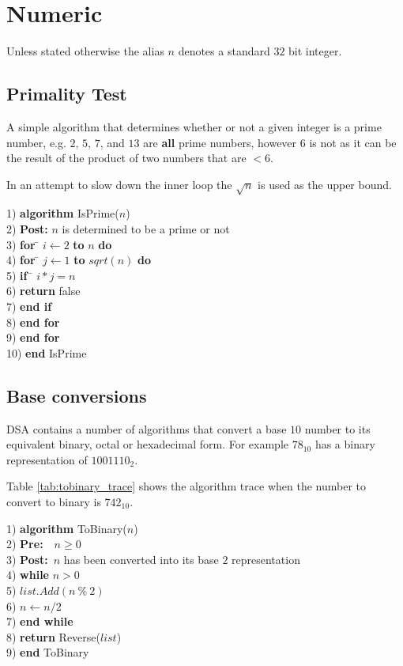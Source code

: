 \chapter{Numeric}
Unless stated otherwise the alias $n$ denotes a standard $32$ bit integer.

\section{Primality Test} \label{cha:Primality}
A simple algorithm that determines whether or not a given integer is a prime number, e.g. $2$, $5$, $7$, and $13$ are \textbf{all} prime numbers, however $6$ is not as it can be the result of the product of two numbers that are $< 6$.

In an attempt to slow down the inner loop the $\sqrt{n}$ is used as the upper bound.

\begin{tabbing}
1) \textbf{alg}\= \textbf{orithm} IsPrime($n$)\\
2) \> \textbf{Post:} $n$ is determined to be a prime or not \\
3) \> \textbf{for} \= $i \leftarrow 2$ \textbf{to} $n$ \textbf{do}\\
4) \> \> \textbf{for} \= $j \leftarrow 1$ \textbf{to} $sqrt(n)$ \textbf{do}\\
5) \> \> \> \textbf{if}~\= $i * j = n$\\
6) \> \> \> \> \textbf{return} false\\
7) \> \> \> \textbf{end if}\\
8) \> \> \textbf{end for}\\	
9) \> \textbf{end for}\\
10) \textbf{end} IsPrime
\end{tabbing}

\section{Base conversions}
DSA contains a number of algorithms that convert a base $10$ number to its equivalent binary, octal or hexadecimal form. For example $78_{10}$ has a binary representation of $1001110_{2}$.

Table \ref{tab:tobinary_trace} shows the algorithm trace when the number to convert to binary is $742_{10}$.

\newpage
\begin{tabbing}
1) \textbf{alg}\= \textbf{orithm} ToBinary($n$)\\
2) \> \textbf{Pre:}~~$n \geq 0$ \\
3) \> \textbf{Post:}~$n$ has been converted into its base $2$ representation \\
4) \> \textbf{whi}\= \textbf{le} $n > 0$\\
5) \> \> $list.Add(n~\%~2)$\\
6) \> \> $n \leftarrow n / 2$\\
7) \> \textbf{end while}\\
8) \> \textbf{return} Reverse($list$) \\
9) \textbf{end} ToBinary\\
\end{tabbing}

